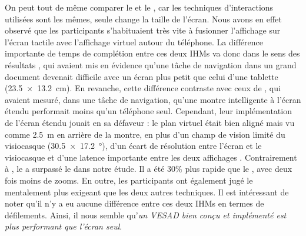 On peut tout de même comparer le  et le , car les techniques d'interactions utilisées sont les mêmes, seule change la taille de l'écran. Nous avons en effet observé que les participants s'habituaient très vite à fusionner l'affichage sur l'écran tactile avec l'affichage virtuel autour du téléphone. La différence importante de temps de complétion entre ces deux IHMs va donc dans le sens des résultats \cite{Raedle2014}, qui avaient mis en évidence qu'une tâche de navigation dans un grand document devenait difficile avec un écran plus petit que celui d'une tablette (\SI{23.5x13.2}{\cm}). En revanche, cette différence contraste avec ceux de \cite{Grubert2015}, qui avaient mesuré, dans une tâche de navigation, qu'une montre intelligente à l'écran étendu performait moins qu'un téléphone seul. Cependant, leur implémentation de l'écran étendu jouait en sa défaveur : le plan virtuel était bien aligné mais vu comme \SI{2.5}{\m} en arrière de la montre, en plus d'un champ de vision limité du visiocasque (\SI{30.5x17.2}{\degree}), d'un écart de résolution entre l'écran et le visiocasque et d'une latence importante entre les deux affichages . Contrairement à \citeauthor{Grubert2015}, le  a surpassé le  dans notre étude. Il a été 30\% plus rapide que le , avec deux fois moins de zooms. En outre, les participants ont également jugé le  mentalement plus exigeant que les deux autres techniques. Il est intéressant de noter qu'il n'y a eu aucune différence entre ces deux IHMs en termes de défilements. Ainsi, il nous semble qu'\emph{un VESAD bien conçu et implémenté est plus performant que l'écran seul}.



